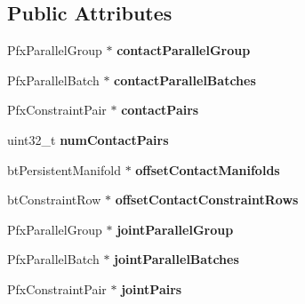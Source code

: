 \subsection*{Public Attributes}
\begin{DoxyCompactItemize}
\item 
\mbox{\label{structPfxSolveConstraintsIO_afd2daf2c4c6a924bb5530675e07a2bd5}} 
Pfx\+Parallel\+Group $\ast$ {\bfseries contact\+Parallel\+Group}
\item 
\mbox{\label{structPfxSolveConstraintsIO_aace8ad29030c1149c1ef0bb72c520e26}} 
Pfx\+Parallel\+Batch $\ast$ {\bfseries contact\+Parallel\+Batches}
\item 
\mbox{\label{structPfxSolveConstraintsIO_ad342b0ba233246fe3671958a24d15066}} 
Pfx\+Constraint\+Pair $\ast$ {\bfseries contact\+Pairs}
\item 
\mbox{\label{structPfxSolveConstraintsIO_a42e2fceb6685be04205dddf12bf8e7d9}} 
uint32\+\_\+t {\bfseries num\+Contact\+Pairs}
\item 
\mbox{\label{structPfxSolveConstraintsIO_a81ed554e67c606874a8a8dcf10bb3195}} 
bt\+Persistent\+Manifold $\ast$ {\bfseries offset\+Contact\+Manifolds}
\item 
\mbox{\label{structPfxSolveConstraintsIO_a5c6e158225451161e9d74508111f50a5}} 
bt\+Constraint\+Row $\ast$ {\bfseries offset\+Contact\+Constraint\+Rows}
\item 
\mbox{\label{structPfxSolveConstraintsIO_a85447a60310d1c07b2657a923ce11008}} 
Pfx\+Parallel\+Group $\ast$ {\bfseries joint\+Parallel\+Group}
\item 
\mbox{\label{structPfxSolveConstraintsIO_aa741caee2b851488fa9eb2314a770d05}} 
Pfx\+Parallel\+Batch $\ast$ {\bfseries joint\+Parallel\+Batches}
\item 
\mbox{\label{structPfxSolveConstraintsIO_adbeba3ddf75b36df45d37bf5e35738fe}} 
Pfx\+Constraint\+Pair $\ast$ {\bfseries joint\+Pairs}

\end{DoxyCompactItemize}

